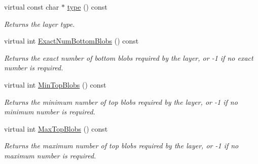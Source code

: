 \begin{DoxyCompactItemize}
virtual const char $\ast$ \mbox{\hyperlink{classcaffe_1_1_pooling_layer_a630cde9866e35304372f3f93d7f6a307}{type}} () const
\begin{DoxyCompactList}\small\item\em Returns the layer type. \end{DoxyCompactList}\item 
virtual int \mbox{\hyperlink{classcaffe_1_1_pooling_layer_a07dc8b1c3bfa3a997dd86b4e53f54019}{Exact\+Num\+Bottom\+Blobs}} () const
\begin{DoxyCompactList}\small\item\em Returns the exact number of bottom blobs required by the layer, or -\/1 if no exact number is required. \end{DoxyCompactList}\item 
virtual int \mbox{\hyperlink{classcaffe_1_1_pooling_layer_abb61ab67b2bd809c5633a2722b83feeb}{Min\+Top\+Blobs}} () const
\begin{DoxyCompactList}\small\item\em Returns the minimum number of top blobs required by the layer, or -\/1 if no minimum number is required. \end{DoxyCompactList}\item 
virtual int \mbox{\hyperlink{classcaffe_1_1_pooling_layer_a76539d04ef7252c12e932ea703f8246b}{Max\+Top\+Blobs}} () const
\begin{DoxyCompactList}\small\item\em Returns the maximum number of top blobs required by the layer, or -\/1 if no maximum number is required. \end{DoxyCompactList}\end{DoxyCompactItemize}
